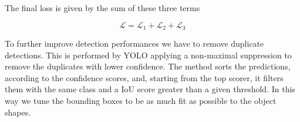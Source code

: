 \documentclass{standalone}
\begin{document}
The final loss is given by the sum of these three terms

\begin{equation}
\mathcal{L} = \mathcal{L}_1 + \mathcal{L}_2 + \mathcal{L}_3
\end{equation}

To further improve detection performances we have to remove duplicate detections.
This is performed by YOLO applying a non-maximal suppression to remove the duplicates with lower confidence.
The method sorts the predictions, according to the confidence scores, and, starting from the top scorer, it filters them with the same class and a IoU score greater than a given threshold.
In this way we tune the bounding boxes to be as much fit as possible to the object shapes.
\end{document}
